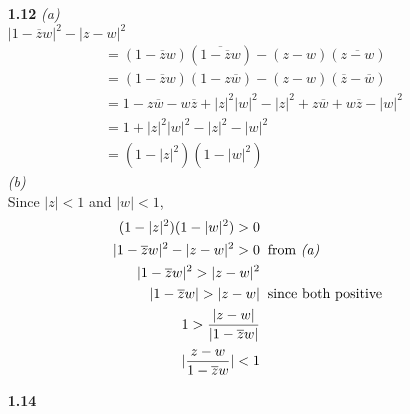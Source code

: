 \begin{enumerate}
\item[\textbf{1.12}]
\textit{(a)} \\
$|1-\overline{z}w|^2 - |z-w|^2$
\begin{align*}
  &= (1-\overline{z}w)(\overline{1-\overline{z}w})
  - (z-w)(\overline{z-w}) \\
  &= (1-\overline{z}w)(1-z\overline{w})
  - (z-w)(\overline{z}-\overline{w}) \\
  &= 1-z\overline{w}-w\overline{z}+|z|^2|w|^2-|z|^2
  +z\overline{w}+w\overline{z}-|w|^2 \\
  &= 1+|z|^2|w|^2-|z|^2-|w|^2 \\
  &= (1-|z|^2)(1-|w|^2)
\end{align*}
\textit{(b)} \\
Since $|z| < 1$ and $|w| < 1$,
\begin{align*}
  (1-|z|^2)(1-|w|^2) > 0& \\
  |1-\overline{z}w|^2 - |z-w|^2 > 0& \:\text{ from \textit{(a)}} \\
  |1-\overline{z}w|^2 > |z-w|^2& \\
  |1-\overline{z}w| > |z-w|& \:\text{ since both positive} \\
  1 > \dfrac{|z-w|}{|1-\overline{z}w|}& \\
  |\dfrac{z-w}{1-\overline{z}w}| < 1&
\end{align*}
\item[\textbf{1.14}]
\end{enumerate}